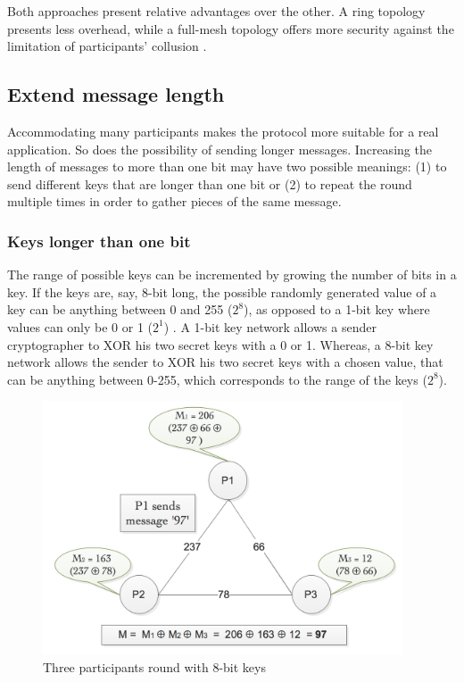 Both approaches present relative advantages over the other. A ring topology presents less overhead, while a full-mesh topology offers more security against the limitation of participants' collusion \cite{Franck}.


\subsection{Extend message length}

Accommodating many participants makes the protocol more suitable for a real application. So does the possibility of sending longer messages. Increasing the length of messages to more than one bit may have two possible meanings: (1) to send different keys that are longer than one bit or (2) to repeat the round multiple times in order to gather pieces of the same message.

\subsubsection{Keys longer than one bit} \label{sec:longerKeys}
The range of possible keys can be incremented by growing the number of bits in a key. If the keys are, say, 8-bit long, the possible randomly generated value of a key can be anything between 0 and 255 ($2^8$), as opposed to a 1-bit key where values can only be 0 or 1 ($2^1$) \cite{Scholz}. A 1-bit key network allows a sender cryptographer to XOR his two secret keys with a 0 or 1. Whereas, a 8-bit key network allows the sender to XOR his two secret keys with a chosen value, that can be anything between 0-255, which corresponds to the range of the keys ($2^8$).

\begin{figure}[H]
    \centering
    \includegraphics[width=0.95\textwidth]{Images/dcnet8bitkeys.png}
    \caption{Three participants round with 8-bit keys}
    \label{fig:xorlongkeys}
\end{figure}

